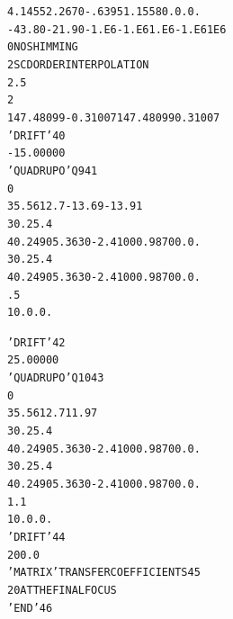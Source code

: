 \begin{tiny}
\begin{alltt}
    4  .1455   2.2670  -.6395  1.1558  0. 0.  0.                                
   -43.80  -21.90 -1.E6 -1.E6  1.E6 -1.E6 1E6
    0                                  NO SHIMMING
    2                                  SCD ORDER INTERPOLATION
     2.5                                                                        
    2                                                       
    147.48099   -0.31007  147.48099    0.31007                                  
   'DRIFT'                                                                40
   -15.00000                                                                    
   'QUADRUPO'                            Q9                               41
   0                                                        
    35.56  12.7  -13.69  -13.91                                                 
    30.  25.4                                                                   
    4    0.2490   5.3630  -2.4100   0.9870   0.   0.                            
    30.  25.4                                                                   
    4    0.2490   5.3630  -2.4100   0.9870   0.   0.                            
     .5                                                                         
    1  0. 0. 0.                                                                 
\end{alltt}
\onecolumn
\clearpage
\begin{alltt}
   'DRIFT'                                                                42
     25.00000                                                                   
   'QUADRUPO'                            Q10                              43
   0                                                        
     35.56  12.7  11.97                                                         
    30.  25.4                                                                   
    4    0.2490   5.3630  -2.4100   0.9870   0.   0.                            
    30.  25.4                                                                   
    4    0.2490   5.3630  -2.4100   0.9870   0.   0.                            
     1.1                                                                        
    1  0. 0. 0.                                                                 
   'DRIFT'                                                                44
    200.0                                                                       
   'MATRIX'                            TRANSFER  COEFFICIENTS             45
   2 0                                 AT  THE  FINAL  FOCUS                  
   'END'                                                                  46
\end{alltt}


\end{tiny}
